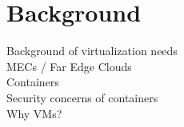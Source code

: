 \chapter{Background}
\label{chapter:background}

Background of virtualization needs \\
MECs / Far Edge Clouds \\
Containers \\
Security concerns of containers \\
Why VMs? \\



